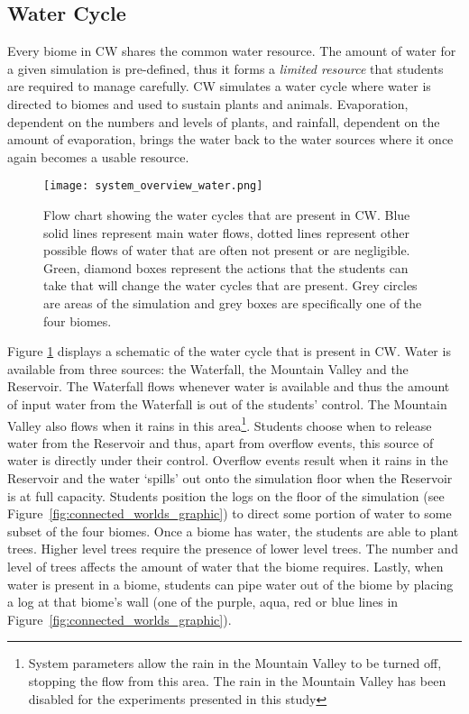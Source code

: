 \subsection{Water Cycle}
Every biome in CW shares the common water resource. The amount of water for a given simulation is pre-defined, thus it forms a \textit{limited resource} that students are required to manage carefully. CW simulates a water cycle where water is directed to biomes and used to sustain plants and animals. Evaporation, dependent on the numbers and levels of plants, and rainfall, dependent on the amount of evaporation, brings the water back to the water sources where it once again becomes a usable resource.

\begin{figure}
\centering
\texttt{[image: system\_overview\_water.png]}
\caption{Flow chart showing the water cycles that are present in CW. Blue solid lines represent main water flows, dotted lines represent other possible flows of water that are often not present or are negligible. Green, diamond boxes represent the actions that the students can take that will change the water cycles that are present. Grey circles are areas of the simulation and grey boxes are specifically one of the four biomes.}
\label{fig:system_overview_water}
\end{figure}

Figure \ref{fig:system_overview_water} displays a schematic of the water cycle that is present in CW. Water is available from three sources: the Waterfall, the Mountain Valley and the Reservoir. The Waterfall flows whenever water is available and thus the amount of input water from the Waterfall is out of the students' control. The Mountain Valley also flows when it rains in this area\footnote{System parameters allow the rain in the Mountain Valley to be turned off, stopping the flow from this area. The rain in the Mountain Valley has been disabled for the experiments presented in this study}. Students choose when to release water from the Reservoir and thus, apart from overflow events, this source of water is directly under their control. Overflow events result when it rains in the Reservoir and the water `spills' out onto the simulation floor when the Reservoir is at full capacity. Students position the logs on the floor of the simulation (see Figure~\ref{fig:connected_worlds_graphic}) to direct some portion of water to some subset of the four biomes. Once a biome has water, the students are able to plant trees. Higher level trees require the presence of lower level trees. The number and level of trees affects the amount of water that the biome requires. Lastly, when water is present in a biome, students can pipe water out of the biome by placing a log at that biome's wall (one of the purple, aqua, red or blue lines in Figure~\ref{fig:connected_worlds_graphic}).



